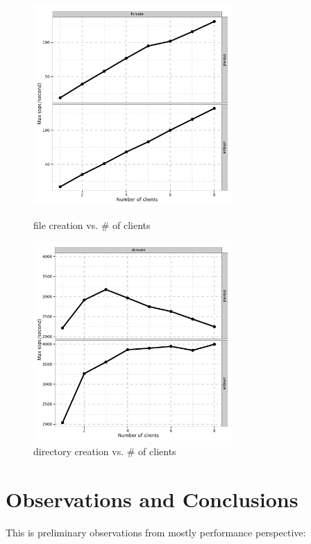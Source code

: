 \documentclass{article}
\begin{document}
\begin{figure}[htb]
\centering
\begin{minipage}[t]{0.5\linewidth}
\centering
\includegraphics[width=3in]{data/mdtest-fcreate}
\caption{file creation vs.  \# of clients}
\label{fig:mdtest-fcreate}
\end{minipage}%
\begin{minipage}[t]{0.5\linewidth}
\centering
\includegraphics[width=3in]{data/mdtest-dcreate}
\caption{directory creation vs. \# of clients}
\label{fig:mdtest-dcreate}
\end{minipage}%
\end{figure}


\section{Observations and Conclusions}

This is preliminary observations from mostly performance perspective:
\end{document}
